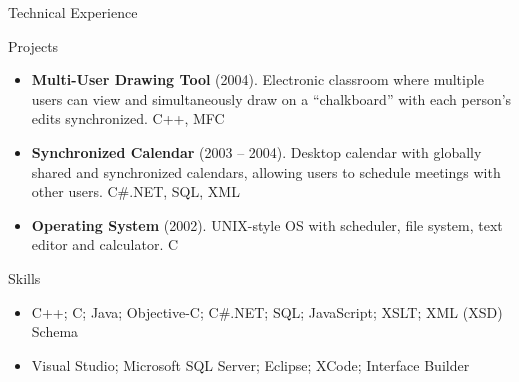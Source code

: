 
\begin{cvsection}{Technical Experience}
	\begin{cvsubsection}{Projects}{}{}
		\begin{itemize}
			\item \textbf{Multi-User Drawing Tool} (2004). Electronic classroom where multiple users can view and simultaneously draw on a “chalkboard” with each person’s edits synchronized.  C++, MFC
			\item \textbf{Synchronized Calendar} (2003 – 2004). Desktop calendar with globally shared and synchronized calendars, allowing users to schedule meetings with other users.  C\#.NET, SQL, XML
			\item \textbf{Operating System} (2002).  UNIX-style OS with scheduler, file system, text editor and calculator. C
		\end{itemize}
	\end{cvsubsection}
\end{cvsection}

\begin{cvsection}{Skills}
	\begin{cvsubsection}{}{}{}	
		\begin{itemize}
			\item C++; C; Java; Objective-C; C\#.NET; SQL; JavaScript; XSLT; XML (XSD) Schema 
			\item Visual Studio; Microsoft SQL Server; Eclipse; XCode; Interface Builder
		\end{itemize}
	\end{cvsubsection}
\end{cvsection}